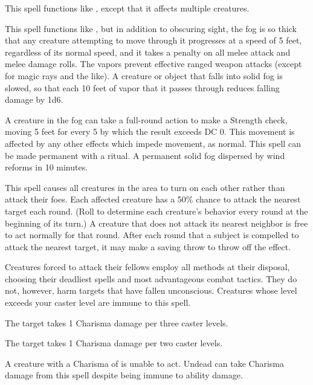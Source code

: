 \spelleffect This spell functions like , except that it affects multiple creatures.

\spelldur{\durmed}
\spelleffect This spell functions like , but in addition to obscuring sight, the fog is so thick that any creature attempting to move through it progresses at a speed of 5 feet, regardless of its normal speed, and it takes a  penalty on all melee attack and melee damage rolls. The vapors prevent effective ranged weapon attacks (except for magic rays and the like). A creature or object that falls into solid fog is slowed, so that each 10 feet of vapor that it passes through reduces falling damage by 1d6.
\par A creature in the fog can take a full-round action to make a Strength check, moving 5 feet for every 5 by which the result exceeds DC 0. This movement is affected by any other effects which impede movement, as normal.
\spellnotes This spell can be made permanent with a  ritual. A permanent solid fog dispersed by wind reforms in 10 minutes. \fogspellnotes

\spelldur{\durshort}
\spelleffect This spell causes all creatures in the area to turn on each other rather than attack their foes. Each affected creature has a 50\% chance to attack the nearest target each round. (Roll to determine each creature's behavior every round at the beginning of its turn.) A creature that does not attack its nearest neighbor is free to act normally for that round. After each round that a subject is compelled to attack the nearest target, it may make a saving throw to throw off the effect.
\par Creatures forced to attack their fellows employ all methods at their disposal, choosing their deadliest spells and most advantageous combat tactics. They do not, however, harm targets that have fallen unconscious.
\spellnotes Creatures whose level exceeds your caster level are immune to this spell.

\begin{spellhealthy}
    The target takes 1 Charisma damage per three caster levels.
\end{spellhealthy}
\begin{spellblood}
    The target takes 1 Charisma damage per two caster levels.
\end{spellblood}
\spellnotes A creature with a Charisma of  is unable to act. Undead can take Charisma damage from this spell despite being immune to ability damage. 

